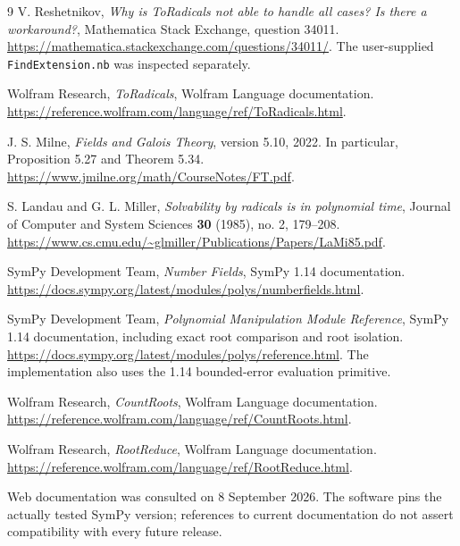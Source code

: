 \documentclass[11pt,a4paper]{article}
\theoremstyle{definition}\newtheorem{definition}[theorem]{Definition}
\theoremstyle{remark}\newtheorem{remark}[theorem]{Remark}
\newcommand{\code}[1]{\texttt{#1}}
\begin{document}
\begin{thebibliography}{9}
V. Reshetnikov, \emph{Why is ToRadicals not able to handle all cases? Is there
a workaround?}, Mathematica Stack Exchange, question 34011.
\url{https://mathematica.stackexchange.com/questions/34011/}.
The user-supplied \code{FindExtension.nb} was inspected separately.

Wolfram Research, \emph{ToRadicals}, Wolfram Language documentation.
\url{https://reference.wolfram.com/language/ref/ToRadicals.html}.

J. S. Milne, \emph{Fields and Galois Theory}, version 5.10, 2022.
In particular, Proposition 5.27 and Theorem 5.34.
\url{https://www.jmilne.org/math/CourseNotes/FT.pdf}.

S. Landau and G. L. Miller, \emph{Solvability by radicals is in polynomial
time}, Journal of Computer and System Sciences \textbf{30} (1985),
no. 2, 179--208.
\url{https://www.cs.cmu.edu/~glmiller/Publications/Papers/LaMi85.pdf}.

SymPy Development Team, \emph{Number Fields}, SymPy 1.14 documentation.
\url{https://docs.sympy.org/latest/modules/polys/numberfields.html}.

SymPy Development Team, \emph{Polynomial Manipulation Module Reference},
SymPy 1.14 documentation, including exact root comparison and root isolation.
\url{https://docs.sympy.org/latest/modules/polys/reference.html}.
The implementation also uses the 1.14 bounded-error evaluation primitive.

Wolfram Research, \emph{CountRoots}, Wolfram Language documentation.
\url{https://reference.wolfram.com/language/ref/CountRoots.html}.

Wolfram Research, \emph{RootReduce}, Wolfram Language documentation.
\url{https://reference.wolfram.com/language/ref/RootReduce.html}.

\end{thebibliography}
\smallskip
\small Web documentation was consulted on 8 September 2026. The software
pins the actually tested SymPy version; references to current documentation
do not assert compatibility with every future release.
\end{document}
